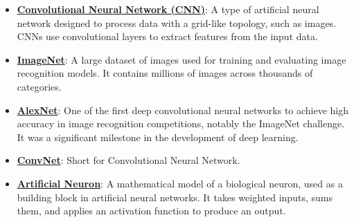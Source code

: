 \documentclass{article}%
\begin{document}
\begin{itemize}[leftmargin=*]%
\item \href{https://purdue.brightspace.com/d2l/common/assets/pdfjs-d2l-dist/1.0.14-legacy/web/viewer.html?file=%2Fcontent%2Fenforced%2F1095467-wl.202510.CS.24300.001%2F09L1-cnn.pdf%3Fou%3D1095467&lang=en-us&container=d2l-fileviewer-rendered-pdf&fullscreen=d2l-fileviewer-rendered-pdf-dialog&height=667#page=2}{\textbf{Convolutional Neural Network (CNN)}}: A type of artificial neural network designed to process data with a grid-like topology, such as images. CNNs use convolutional layers to extract features from the input data.%
\item \href{https://purdue.brightspace.com/d2l/common/assets/pdfjs-d2l-dist/1.0.14-legacy/web/viewer.html?file=%2Fcontent%2Fenforced%2F1095467-wl.202510.CS.24300.001%2F09L1-cnn.pdf%3Fou%3D1095467&lang=en-us&container=d2l-fileviewer-rendered-pdf&fullscreen=d2l-fileviewer-rendered-pdf-dialog&height=667#page=3}{\textbf{ImageNet}}: A large dataset of images used for training and evaluating image recognition models. It contains millions of images across thousands of categories.%
\item \href{https://purdue.brightspace.com/d2l/common/assets/pdfjs-d2l-dist/1.0.14-legacy/web/viewer.html?file=%2Fcontent%2Fenforced%2F1095467-wl.202510.CS.24300.001%2F09L1-cnn.pdf%3Fou%3D1095467&lang=en-us&container=d2l-fileviewer-rendered-pdf&fullscreen=d2l-fileviewer-rendered-pdf-dialog&height=667#page=3}{\textbf{AlexNet}}: One of the first deep convolutional neural networks to achieve high accuracy in image recognition competitions, notably the ImageNet challenge. It was a significant milestone in the development of deep learning.%
\item \href{https://purdue.brightspace.com/d2l/common/assets/pdfjs-d2l-dist/1.0.14-legacy/web/viewer.html?file=%2Fcontent%2Fenforced%2F1095467-wl.202510.CS.24300.001%2F09L1-cnn.pdf%3Fou%3D1095467&lang=en-us&container=d2l-fileviewer-rendered-pdf&fullscreen=d2l-fileviewer-rendered-pdf-dialog&height=667#page=4}{\textbf{ConvNet}}: Short for Convolutional Neural Network.%
\item \href{https://purdue.brightspace.com/d2l/common/assets/pdfjs-d2l-dist/1.0.14-legacy/web/viewer.html?file=%2Fcontent%2Fenforced%2F1095467-wl.202510.CS.24300.001%2F09L1-cnn.pdf%3Fou%3D1095467&lang=en-us&container=d2l-fileviewer-rendered-pdf&fullscreen=d2l-fileviewer-rendered-pdf-dialog&height=667#page=5}{\textbf{Artificial Neuron}}: A mathematical model of a biological neuron, used as a building block in artificial neural networks. It takes weighted inputs, sums them, and applies an activation function to produce an output.%

\end{itemize}
\end{document}
